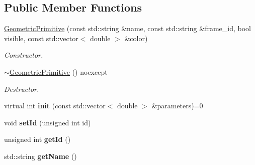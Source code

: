 \subsection*{Public Member Functions}
\begin{DoxyCompactItemize}
\item 
\hypertarget{classhiqp_1_1GeometricPrimitive_aaa57f399f337a8409d090406f2884af3}{\hyperlink{classhiqp_1_1GeometricPrimitive_aaa57f399f337a8409d090406f2884af3}{Geometric\-Primitive} (const std\-::string \&name, const std\-::string \&frame\-\_\-id, bool visible, const std\-::vector$<$ double $>$ \&color)}\label{classhiqp_1_1GeometricPrimitive_aaa57f399f337a8409d090406f2884af3}

\begin{DoxyCompactList}\small\item\em Constructor. \end{DoxyCompactList}\item 
\hypertarget{classhiqp_1_1GeometricPrimitive_ac0df1079398e6ed8de91b29cebefe492}{\hyperlink{classhiqp_1_1GeometricPrimitive_ac0df1079398e6ed8de91b29cebefe492}{$\sim$\-Geometric\-Primitive} () noexcept}\label{classhiqp_1_1GeometricPrimitive_ac0df1079398e6ed8de91b29cebefe492}

\begin{DoxyCompactList}\small\item\em Destructor. \end{DoxyCompactList}\item 
\hypertarget{classhiqp_1_1GeometricPrimitive_a37a97c4622067ad90ccddb53641a0464}{virtual int {\bfseries init} (const std\-::vector$<$ double $>$ \&parameters)=0}\label{classhiqp_1_1GeometricPrimitive_a37a97c4622067ad90ccddb53641a0464}

\item 
\hypertarget{classhiqp_1_1GeometricPrimitive_af181b1f6249f7a6787a8515c6ec2295c}{void {\bfseries set\-Id} (unsigned int id)}\label{classhiqp_1_1GeometricPrimitive_af181b1f6249f7a6787a8515c6ec2295c}

\item 
\hypertarget{classhiqp_1_1GeometricPrimitive_a542ae93207fdfd6332def2b551baa572}{unsigned int {\bfseries get\-Id} ()}\label{classhiqp_1_1GeometricPrimitive_a542ae93207fdfd6332def2b551baa572}

\item 
\hypertarget{classhiqp_1_1GeometricPrimitive_a8d218f9aa063c2b1812c0d4d6aa60ae6}{std\-::string {\bfseries get\-Name} ()}\label{classhiqp_1_1GeometricPrimitive_a8d218f9aa063c2b1812c0d4d6aa60ae6}


\end{DoxyCompactItemize}
